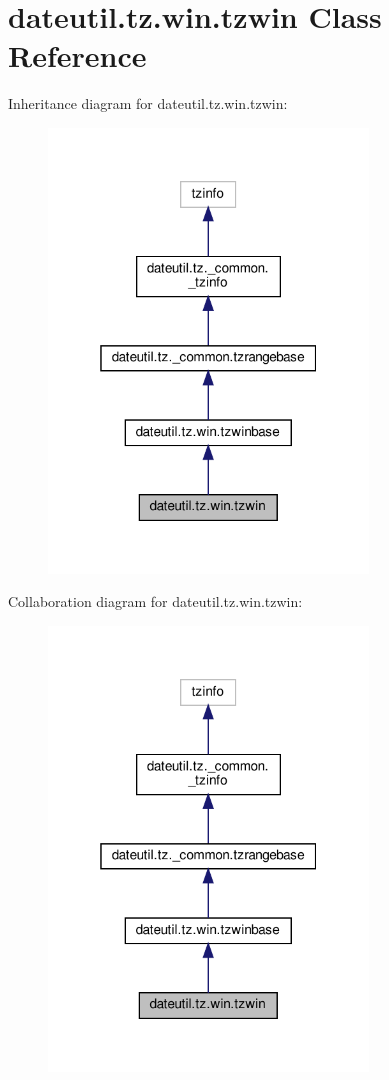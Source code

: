 \hypertarget{classdateutil_1_1tz_1_1win_1_1tzwin}{}\section{dateutil.\+tz.\+win.\+tzwin Class Reference}
\label{classdateutil_1_1tz_1_1win_1_1tzwin}


Inheritance diagram for dateutil.\+tz.\+win.\+tzwin\+:
\nopagebreak
\begin{figure}[H]
\begin{center}
\leavevmode
\includegraphics[width=241pt]{classdateutil_1_1tz_1_1win_1_1tzwin__inherit__graph}
\end{center}
\end{figure}


Collaboration diagram for dateutil.\+tz.\+win.\+tzwin\+:
\nopagebreak
\begin{figure}[H]
\begin{center}
\leavevmode
\includegraphics[width=241pt]{classdateutil_1_1tz_1_1win_1_1tzwin__coll__graph}
\end{center}
\end{figure}
